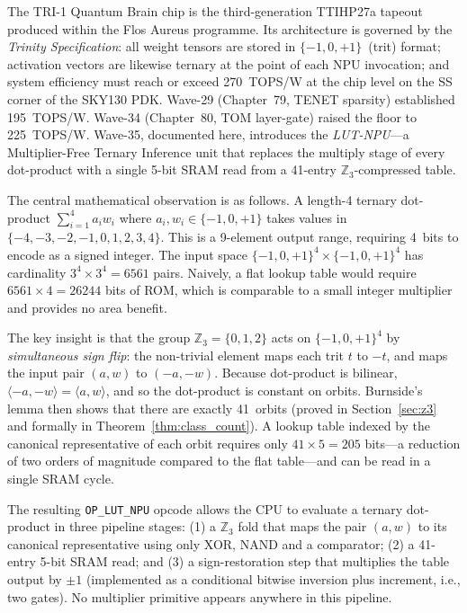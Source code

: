 The TRI-1 Quantum Brain chip is the third-generation TTIHP27a tapeout
produced within the Flos Aureus programme.  Its architecture is governed
by the \emph{Trinity Specification}: all weight tensors are stored in
\(\{-1, 0, +1\}\)~(trit) format; activation vectors are likewise ternary
at the point of each NPU invocation; and system efficiency must reach or
exceed 270~TOPS/W at the chip level on the SS corner of the SKY130 PDK.
Wave-29 (Chapter~79, TENET sparsity) established 195~TOPS/W.
Wave-34 (Chapter~80, TOM layer-gate) raised the floor to 225~TOPS/W.
Wave-35, documented here, introduces the \emph{LUT-NPU}---a
Multiplier-Free Ternary Inference unit that replaces the multiply stage
of every dot-product with a single 5-bit SRAM read from a 41-entry
\(\mathbb{Z}_3\)-compressed table.

The central mathematical observation is as follows.  A length-4 ternary
dot-product \(\sum_{i=1}^{4} a_i w_i\) where
\(a_i, w_i \in \{-1,0,+1\}\) takes values in \(\{-4,-3,-2,-1,0,1,2,3,4\}\).
This is a 9-element output range, requiring 4~bits to encode as a signed
integer.  The input space \(\{-1,0,+1\}^4 \times \{-1,0,+1\}^4\) has
cardinality \(3^4 \times 3^4 = 6561\) pairs.  Naively, a flat lookup
table would require \(6561 \times 4 = 26244\) bits of ROM, which is
comparable to a small integer multiplier and provides no area benefit.

The key insight is that the group \(\mathbb{Z}_3 = \{0, 1, 2\}\) acts on
\(\{-1,0,+1\}^4\) by \emph{simultaneous sign flip}: the non-trivial
element maps each trit \(t\) to \(-t\), and maps the input pair
\((a, w)\) to \((-a, -w)\).  Because dot-product is bilinear,
\(\langle -a, -w \rangle = \langle a, w \rangle\), and so the dot-product
is constant on orbits.  Burnside's lemma then shows that there are exactly
41~orbits (proved in Section~\ref{sec:z3} and formally in
Theorem~\ref{thm:class_count}).  A lookup table indexed by the
canonical representative of each orbit requires only
\(41 \times 5 = 205\) bits---a reduction of two orders of magnitude
compared to the flat table---and can be read in a single SRAM cycle.

The resulting \texttt{OP\_LUT\_NPU} opcode allows the CPU to evaluate
a ternary dot-product in three pipeline stages: (1) a \(\mathbb{Z}_3\)
fold that maps the pair \((a,w)\) to its canonical representative using
only XOR, NAND and a comparator; (2) a 41-entry 5-bit SRAM read; and
(3) a sign-restoration step that multiplies the table output by
\(\pm 1\) (implemented as a conditional bitwise inversion plus
increment, i.e., two gates).  No multiplier primitive appears anywhere in
this pipeline.


